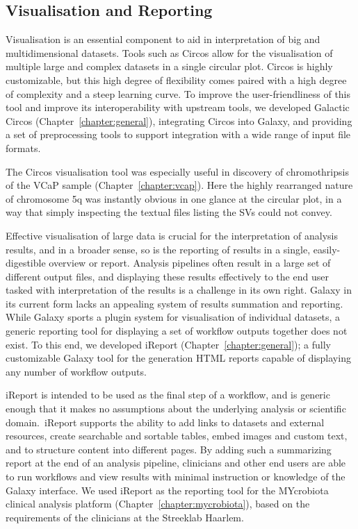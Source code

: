 \subsection{Visualisation and Reporting}
Visualisation is an essential component to aid in interpretation of big and multidimensional datasets. Tools such as Circos \cite{circos} allow for the visualisation of multiple large and complex datasets in a single circular plot. Circos is highly customizable, but this high degree of flexibility comes paired with a high degree of complexity and a steep learning curve. To improve the user-friendliness of this tool and improve its interoperability with upstream tools, we developed Galactic Circos (Chapter~\ref{chapter:general}), integrating Circos into Galaxy, and providing a set of preprocessing tools to support integration with a wide range of input file formats.

The Circos visualisation tool was especially useful in discovery of chromothripsis of the VCaP sample (Chapter~\ref{chapter:vcap}).
Here the highly rearranged nature of chromosome 5q was instantly obvious in one glance at the circular plot, in a way that simply inspecting the textual files listing the SVs could not convey.

Effective visualisation of large data is crucial for the interpretation of analysis results, and in a broader sense, so is the reporting of results in a single, easily-digestible overview or report. Analysis pipelines often result in a large set of different output files, and displaying these results effectively to the end user tasked with interpretation of the results is a challenge in its own right.
Galaxy in its current form lacks an appealing system of results summation and reporting. While Galaxy sports a plugin system for visualisation of individual datasets, a generic reporting tool for displaying a set of workflow outputs together does not exist. To this end, we developed iReport (Chapter~\ref{chapter:general}); a fully customizable Galaxy tool for the generation HTML reports capable of displaying any number of workflow outputs.\

iReport is intended to be used as the final step of a workflow, and is generic enough that it makes no assumptions about the underlying analysis or scientific domain.\ iReport supports  the ability to add links to datasets and external resources, create searchable and sortable tables, embed images and custom text, and to structure content into different pages.
By adding such a summarizing report at the end of an analysis pipeline, clinicians and other end users are able to run workflows and view results with minimal instruction or knowledge of the Galaxy interface.
We used iReport as the reporting tool for the MYcrobiota clinical analysis platform (Chapter~\ref{chapter:mycrobiota}), based on the requirements of the clinicians at the Streeklab Haarlem.

